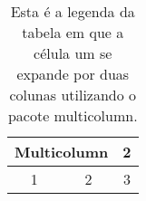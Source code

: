 \documentclass[a4paper, 12pt]{article}
\begin{document}
    \begin{table}[H]
      \caption{Esta é a legenda da tabela em que a célula um se expande por duas colunas 
      utilizando o pacote multicolumn.}
      \centering %
      
      \begin{tabular}{|c|c|c|} %

      \hline %
      
      \multicolumn{2}{|c|}{Multicolumn} & 2\\ \hline
      1 & 2 & 3\\
      \hline
      
      \end{tabular}
  \end{table}
\end{document}
